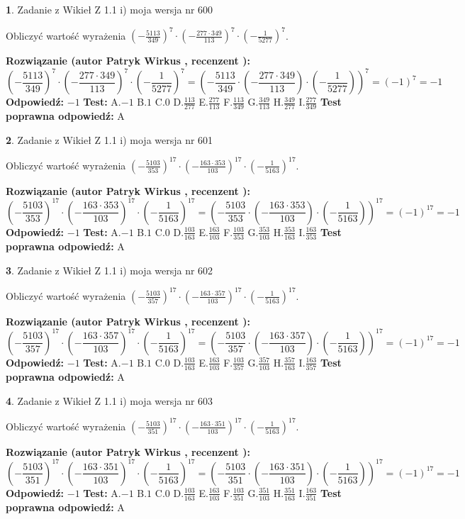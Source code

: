 \documentclass[12pt, a4paper]{article}
\theoremstyle{definition} %
\newtheorem{zad}{}
\newcommand{\zadStart}[1]{\begin{zad}#1\newline}
\newcommand{\zadStop}{\end{zad}}
\newcommand{\rozwStart}[2]{\noindent \textbf{Rozwiązanie (autor #1 , recenzent #2): }\newline}
\newcommand{\rozwStop}{\newline}
\newcommand{\odpStart}{\noindent \textbf{Odpowiedź:}\newline}
\newcommand{\odpStop}{\newline}
\newcommand{\testStart}{\noindent \textbf{Test:}\newline}
\newcommand{\testStop}{\newline}
\newcommand{\kluczStart}{\noindent \textbf{Test poprawna odpowiedź:}\newline}
\newcommand{\kluczStop}{\newline}
\begin{document}
\zadStart{Zadanie z Wikieł Z 1.1 i) moja wersja nr 600}

Obliczyć wartość wyrażenia $(-\frac{5113}{349})^{7} \cdot (-\frac{277 \cdot 349}{113})^{7} \cdot (-\frac{1}{5277})^{7}$.
\zadStop
\rozwStart{Patryk Wirkus}{}
$$(-\frac{5113}{349})^{7} \cdot (-\frac{277 \cdot 349}{113})^{7} \cdot (-\frac{1}{5277})^{7} = (-\frac{5113}{349} \cdot (-\frac{277 \cdot 349}{113}) \cdot (-\frac{1}{5277}))^{7} = (-1)^{7} = -1$$
\rozwStop
\odpStart
$-1$
\odpStop
\testStart
A.$-1$ B.$1$ C.$0$ D.$\frac{113}{277}$ E.$\frac{277}{113}$
F.$\frac{113}{349}$ G.$\frac{349}{113}$
H.$\frac{349}{277}$
I.$\frac{277}{349}$
\testStop
\kluczStart
A
\kluczStop



\zadStart{Zadanie z Wikieł Z 1.1 i) moja wersja nr 601}

Obliczyć wartość wyrażenia $(-\frac{5103}{353})^{17} \cdot (-\frac{163 \cdot 353}{103})^{17} \cdot (-\frac{1}{5163})^{17}$.
\zadStop
\rozwStart{Patryk Wirkus}{}
$$(-\frac{5103}{353})^{17} \cdot (-\frac{163 \cdot 353}{103})^{17} \cdot (-\frac{1}{5163})^{17} = (-\frac{5103}{353} \cdot (-\frac{163 \cdot 353}{103}) \cdot (-\frac{1}{5163}))^{17} = (-1)^{17} = -1$$
\rozwStop
\odpStart
$-1$
\odpStop
\testStart
A.$-1$ B.$1$ C.$0$ D.$\frac{103}{163}$ E.$\frac{163}{103}$
F.$\frac{103}{353}$ G.$\frac{353}{103}$
H.$\frac{353}{163}$
I.$\frac{163}{353}$
\testStop
\kluczStart
A
\kluczStop



\zadStart{Zadanie z Wikieł Z 1.1 i) moja wersja nr 602}

Obliczyć wartość wyrażenia $(-\frac{5103}{357})^{17} \cdot (-\frac{163 \cdot 357}{103})^{17} \cdot (-\frac{1}{5163})^{17}$.
\zadStop
\rozwStart{Patryk Wirkus}{}
$$(-\frac{5103}{357})^{17} \cdot (-\frac{163 \cdot 357}{103})^{17} \cdot (-\frac{1}{5163})^{17} = (-\frac{5103}{357} \cdot (-\frac{163 \cdot 357}{103}) \cdot (-\frac{1}{5163}))^{17} = (-1)^{17} = -1$$
\rozwStop
\odpStart
$-1$
\odpStop
\testStart
A.$-1$ B.$1$ C.$0$ D.$\frac{103}{163}$ E.$\frac{163}{103}$
F.$\frac{103}{357}$ G.$\frac{357}{103}$
H.$\frac{357}{163}$
I.$\frac{163}{357}$
\testStop
\kluczStart
A
\kluczStop



\zadStart{Zadanie z Wikieł Z 1.1 i) moja wersja nr 603}

Obliczyć wartość wyrażenia $(-\frac{5103}{351})^{17} \cdot (-\frac{163 \cdot 351}{103})^{17} \cdot (-\frac{1}{5163})^{17}$.
\zadStop
\rozwStart{Patryk Wirkus}{}
$$(-\frac{5103}{351})^{17} \cdot (-\frac{163 \cdot 351}{103})^{17} \cdot (-\frac{1}{5163})^{17} = (-\frac{5103}{351} \cdot (-\frac{163 \cdot 351}{103}) \cdot (-\frac{1}{5163}))^{17} = (-1)^{17} = -1$$
\rozwStop
\odpStart
$-1$
\odpStop
\testStart
A.$-1$ B.$1$ C.$0$ D.$\frac{103}{163}$ E.$\frac{163}{103}$
F.$\frac{103}{351}$ G.$\frac{351}{103}$
H.$\frac{351}{163}$
I.$\frac{163}{351}$
\testStop
\kluczStart
A
\kluczStop
\end{document}
